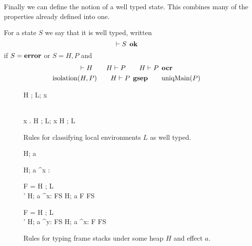 Finally we can define the notion of a well typed state. This combines many of
the properties already defined into one.
\begin{definition}
  For a state $S$ we say that it is well typed, written
  \begin{equation}
    \vdash S \:\: \mbox{\bf ok}
  \end{equation}
  if $S = \mbox{{\bf error}}$ or $S = H, P$ and
  \begin{equation*}
    \begin{gathered}
      \vdash H \quad\quad H \vdash P \quad\quad H \vdash P \:\: \mbox{\bf ocr} \\
      \mbox{$\mathrm{isolation}$}{(H, P)} \quad\quad H \vdash P \:\: \mbox{\bf gsep} \quad\quad \mbox{$\mathrm{uniqMain}$}(P)
    \end{gathered}
  \end{equation*}
  
\end{definition}

\begin{figure}
  {}
  { H \vdash \Gamma; L; x }

  \RuleSpace{}

  {\dom{(\Gamma)} \subseteq {} \\
    \forall x \in \dom{(\Gamma)}. \: H \vdash \Gamma; L; x 
  }
  { H \vdash \Gamma; L }

  \caption{Rules for classifying local environments $L$ as well typed.}
  \label{fig:local_typing}
\end{figure}

\begin{figure}
  {H; a \vdash \varepsilon}

  \RuleSpace{}

  {H; a \vdash^{x : \sigma} \varepsilon}

  \RuleSpace{}

  { F =  \andalso H \vdash \Gamma; L \\
   \andalso \sigma' \stof \sigma \andalso H; a \vdash^{x: \sigma} FS }
  { H; a \vdash F \circ FS }
  
  \RuleSpace{}

  { F =  \andalso H \vdash \Gamma; L \\
   \andalso \sigma' \stof \sigma 
  \andalso H; a \vdash^{y: \sigma} FS }
  { H; a \vdash^{x: \tau} F \circ FS }

  \caption{Rules for typing frame stacks under some heap $H$ and effect $a$.}
  \label{fig:fs_typing}
\end{figure}

